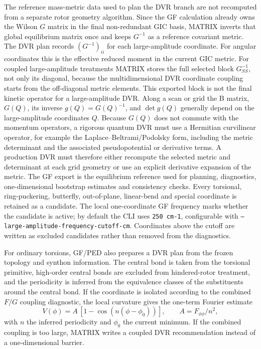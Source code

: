 \documentclass[11pt]{article}
\begin{document}
The reference mass-metric data used to plan the DVR branch are not recomputed
from a separate rotor geometry algorithm.  Since the GF calculation already
owns the Wilson \(G\) matrix in the final non-redundant GIC basis, MATRIX
inverts that global equilibrium matrix once and keeps \(G^{-1}\) as a reference
covariant metric.  The DVR plan records
\((G^{-1})_{ii}\) for each large-amplitude coordinate.  For angular coordinates
this is the effective reduced moment in the current GIC metric.  For coupled
large-amplitude treatments MATRIX stores the full selected block
\(G^{-1}_{SS}\), not only its diagonal, because the multidimensional DVR
coordinate coupling starts from the off-diagonal metric elements.
This exported block is not the final kinetic operator for a large-amplitude
DVR.  Along a scan or grid the B matrix, \(G(Q)\), its inverse
\(g(Q)=G(Q)^{-1}\), and \(\det g(Q)\) generally depend on the
large-amplitude coordinates \(Q\).  Because \(G(Q)\) does not commute with the
momentum operators, a rigorous quantum DVR must use a Hermitian curvilinear
operator, for example the Laplace--Beltrami/Podolsky form, including the metric
determinant and the associated pseudopotential or derivative terms.  A
production DVR must therefore either recompute the selected metric and
determinant at each grid geometry or use an explicit derivative expansion of
the metric.  The GF export is the equilibrium reference used for planning,
diagnostics, one-dimensional bootstrap estimates and consistency checks.
Every torsional, ring-puckering, butterfly, out-of-plane, linear-bend and
special coordinate is retained as a candidate.  The local one-coordinate GF
frequency marks whether the candidate is active; by default the CLI uses
\texttt{250 cm-1}, configurable with
\texttt{--large-amplitude-frequency-cutoff-cm}.  Coordinates above the cutoff
are written as excluded candidates rather than removed from the diagnostics.

For ordinary torsions, GF/PED also prepares a DVR plan from the frozen topology
and synthon information.  The central bond is taken from the torsional
primitive, high-order central bonds are excluded from hindered-rotor treatment,
and the periodicity is inferred from the equivalence classes of the
substituents around the central bond.  If the coordinate is isolated according
to the combined \(F/G\) coupling diagnostic, the local curvature gives the
one-term Fourier estimate
\[
  V(\phi) = A\,[1-\cos(n(\phi-\phi_0))], \qquad
  A = F_{\phi\phi}/n^2,
\]
with \(n\) the inferred periodicity and \(\phi_0\) the current minimum.  If the
combined coupling is too large, MATRIX writes a coupled DVR recommendation
instead of a one-dimensional barrier.
\end{document}
